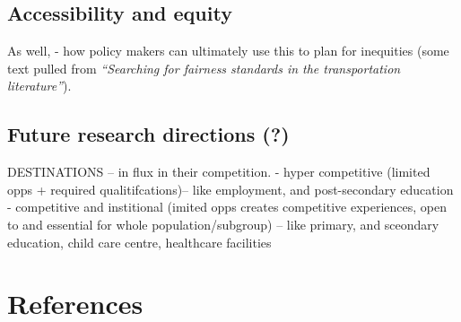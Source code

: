 \documentclass[
11pt, %
oneside, %
english, %
singlespacing, %
]{macthesis} %
\begin{document}
\section{Accessibility and equity}\label{accessibility-and-equity}

As well,
- how policy makers can ultimately use this to plan for inequities (some text pulled from \emph{``Searching for fairness standards in the transportation literature''}).

\section{Future research directions (?)}\label{future-research-directions}

DESTINATIONS -- in flux in their competition.
- hyper competitive (limited opps + required qualitifcations)-- like employment, and post-secondary education
- competitive and institional (imited opps creates competitive experiences, open to and essential for whole population/subgroup) -- like primary, and sceondary education, child care centre, healthcare facilities

\backmatter

\chapter*{References}\label{references}


\noindent

\setlength{\parindent}{-0.20in}
\setlength{\leftskip}{0.20in}
\setlength{\parskip}{8pt}
\end{document}
